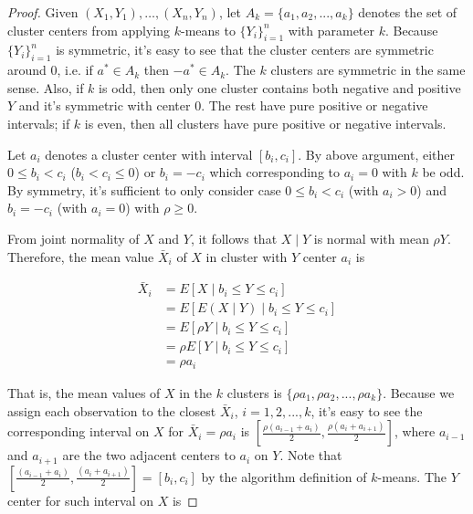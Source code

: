 \documentclass[12pt]{article}
\begin{document}
\begin{proof}
Given $(X_1, Y_1), \dotsc, (X_n, Y_n)$, let $A_k = \{a_1,a_2,...,a_k\}$ denotes the set of cluster centers from applying $k$-means to $\{ Y_i\}_{i=1}^{n}$ with parameter $k$. Because $\{ Y_i\}_{i=1}^{n}$ is symmetric, it's easy to see that the cluster centers are symmetric around $0$, i.e. if $a^* \in A_k$ then $-a^* \in A_k$. The $k$ clusters are symmetric in the same sense. Also, if $k$ is odd, then only one cluster contains both negative and positive $Y$ and it's symmetric with center $0$. The rest have pure positive or negative intervals; if $k$ is even, then all clusters have pure positive or negative intervals. 

Let $a_i$ denotes a cluster center with interval $[b_i, c_i]$. By above argument, either $0 \leq b_i < c_i$ ($b_i < c_i \leq 0$) or $b_i = -c_i$ which corresponding to $a_i=0$ with $k$ be odd. By symmetry, it's sufficient to only consider case $0 \leq b_i < c_i$ (with $a_i > 0 $) and $b_i = -c_i$ (with $a_i = 0 $) with $\rho \geq 0$. 

From joint normality of $X$ and $Y$, it follows that $X \mid Y$ is normal with mean $\rho Y$. Therefore, the mean value $\bar{X}_i$ of $X$ in cluster with $Y$ center $a_i$ is  

\begin{align*}
	\bar{X}_i &= E[X \mid b_i \leq Y \leq c_i] \\
			&= E[ E(X \mid Y) \mid b_i \leq Y \leq c_i] \\
			&= E[\rho Y \mid b_i \leq Y \leq c_i] \\
			&= \rho E[ Y \mid b_i \leq Y \leq c_i] \\
			&= \rho a_i
\end{align*}

That is, the mean values of $X$ in the $k$ clusters is $\{\rho a_1,\rho a_2,...,\rho a_k\}$. Because we assign each observation to the closest $\bar{X}_i$, $i=1,2,...,k$, it's easy to see the corresponding interval on $X$ for $\bar{X}_i = \rho a_i$ is $[\frac{\rho \left( a_{i-1}+a_i\right)}{2}, \frac{\rho \left( a_{i}+a_{i+1}\right)}{2}]$, where $a_{i-1}$ and $a_{i+1}$ are the two adjacent centers to $a_i$ on $Y$. Note that $[\frac{ \left( a_{i-1}+a_i\right)}{2}, \frac{\left( a_{i}+a_{i+1}\right)}{2}] = [b_i, c_i]$ by the algorithm definition of $k$-means. The $Y$ center for such interval on $X$ is


\end{proof}
\end{document}
